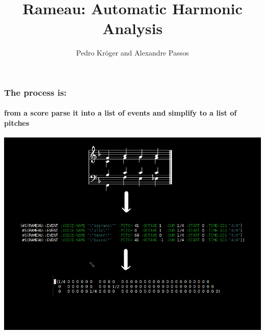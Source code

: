 \documentclass{beamer}
\title{Rameau: Automatic Harmonic Analysis}
\author{Pedro Kröger and Alexandre Passos}
\begin{document}
\maketitle

\begin{frame}
  \frametitle{The process is:}
  \framesubtitle{from a score parse it into a list of events and
    simplify to a list of pitches}
  \addvspace{0.5em}
  \includegraphics[scale=0.5, trim = 9em 0cm 0cm 2em, clip]{figs/process}
\end{frame}
\end{document}
